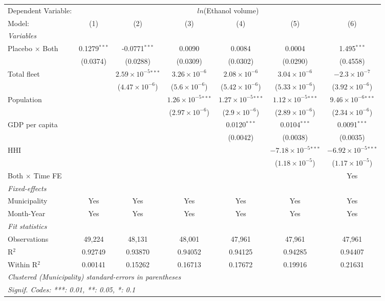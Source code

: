 \documentclass[
]{article}
\begin{document}
\begin{tabular}{lcccccc}
\tabularnewline\midrule\midrule
Dependent Variable:&\multicolumn{6}{c}{$ln$(Ethanol volume)}\\
Model:&(1) & (2) & (3) & (4) & (5) & (6)\\
\midrule \emph{Variables}&   &   &   &   &   &  \\
Placebo $\times $ Both & 0.1279$^{***}$ & -0.0771$^{***}$ & 0.0090 & 0.0084 & 0.0004 & 1.495$^{***}$\\
  &(0.0374) & (0.0288) & (0.0309) & (0.0302) & (0.0290) & (0.4558)\\
Total fleet &    & $2.59\times 10^{-5}$$^{***}$ & $3.26\times 10^{-6}$ & $2.08\times 10^{-6}$ & $3.04\times 10^{-6}$ & $-2.3\times 10^{-7}$\\
  &   & ($4.47\times 10^{-6}$) & ($5.6\times 10^{-6}$) & ($5.42\times 10^{-6}$) & ($5.33\times 10^{-6}$) & ($3.92\times 10^{-6}$)\\
Population &    &    & $1.26\times 10^{-5}$$^{***}$ & $1.27\times 10^{-5}$$^{***}$ & $1.12\times 10^{-5}$$^{***}$ & $9.46\times 10^{-6}$$^{***}$\\
  &   &    & ($2.97\times 10^{-6}$) & ($2.9\times 10^{-6}$) & ($2.89\times 10^{-6}$) & ($2.34\times 10^{-6}$)\\
GDP per capita &    &    &    & 0.0120$^{***}$ & 0.0104$^{***}$ & 0.0091$^{***}$\\
  &   &    &    & (0.0042) & (0.0038) & (0.0035)\\
HHI &    &    &    &    & $-7.18\times 10^{-5}$$^{***}$ & $-6.92\times 10^{-5}$$^{***}$\\
  &   &    &    &    & ($1.18\times 10^{-5}$) & ($1.17\times 10^{-5}$)\\
Both $\times$ Time FE &  &  &  &  &  & Yes\\
\midrule \emph{Fixed-effects}&   &   &   &   &   &  \\
Municipality & Yes & Yes & Yes & Yes & Yes & Yes\\
Month-Year & Yes & Yes & Yes & Yes & Yes & Yes\\
\midrule \emph{Fit statistics}&  & & & & & \\
Observations & 49,224&48,131&48,001&47,961&47,961&47,961\\
R$^2$ & 0.92749&0.93870&0.94052&0.94125&0.94285&0.94407\\
Within R$^2$ & 0.00141&0.15262&0.16713&0.17672&0.19916&0.21631\\
\midrule\midrule\multicolumn{7}{l}{\emph{Clustered (Municipality) standard-errors in parentheses}}\\
\multicolumn{7}{l}{\emph{Signif. Codes: ***: 0.01, **: 0.05, *: 0.1}}\\
\end{tabular}
\end{document}
